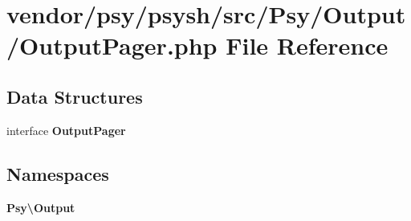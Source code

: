 \section{vendor/psy/psysh/src/\+Psy/\+Output/\+Output\+Pager.php File Reference}
\label{_output_pager_8php}
\subsection*{Data Structures}
\begin{DoxyCompactItemize}
\item 
interface {\bf Output\+Pager}
\end{DoxyCompactItemize}
\subsection*{Namespaces}
\begin{DoxyCompactItemize}
\item 
 {\bf Psy\textbackslash{}\+Output}
\end{DoxyCompactItemize}
